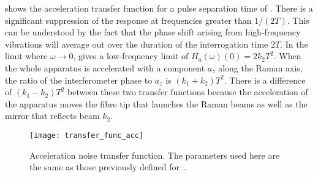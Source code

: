 shows the acceleration transfer function for a pulse separation time
of . There is a significant suppression of the
response
at frequencies greater than $1/(2T)$. This can be understood by the
fact that the phase shift arising from
high-frequency vibrations will average out over the duration of the
interrogation time $2T$. In the limit where $\omega \rightarrow 0$,
 gives a low-frequency limit of
  $H_a(\omega)(0) = 2k_{2} T^2$. When the whole apparatus is
  accelerated with a component $a_z$ along the Raman axis, the ratio
  of the interferometer phase to $a_z$ is $(k_1 +k_2)T^2$. There is a
  difference of $(k_1-k_2) T^2$ between these two transfer functions
  because the acceleration of the apparatus moves the fibre tip that
  launches the Raman beams as well as the mirror that reflects beam
  $k_2$.
\begin{figure}[htpb]
  \centering
  \texttt{[image: transfer\_func\_acc]}
  \caption[Acceleration noise transfer function.]{Acceleration noise
  transfer function. The parameters used here are the same as those
previously defined for~.}
  \label{fig:transfer_func_acc}
\end{figure}
